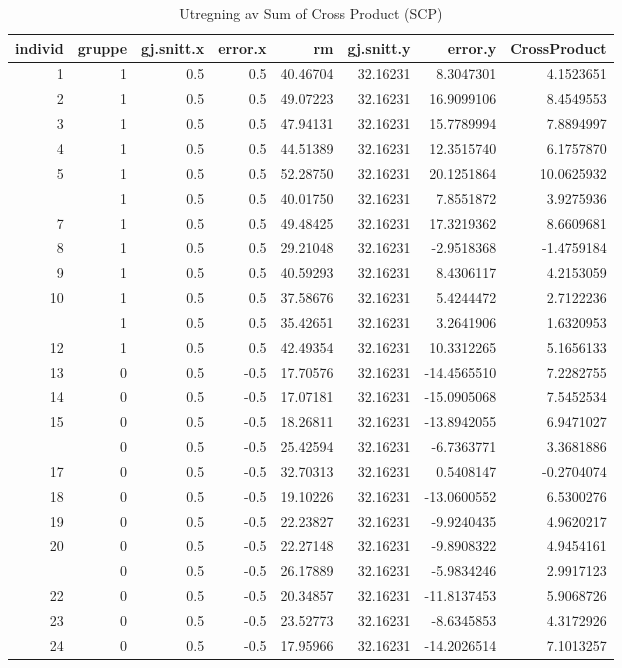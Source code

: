 \documentclass[
]{book}
\begin{document}
\begin{table}

\caption{\label{tab:unnamed-chunk-18}Utregning av Sum of Cross Product (SCP)}
\centering
\begin{tabular}[t]{rrrrrrrr}
\toprule
individ & gruppe & gj.snitt.x & error.x & rm & gj.snitt.y & error.y & CrossProduct\\
\midrule
1 & 1 & 0.5 & 0.5 & 40.46704 & 32.16231 & 8.3047301 & 4.1523651\\
2 & 1 & 0.5 & 0.5 & 49.07223 & 32.16231 & 16.9099106 & 8.4549553\\
3 & 1 & 0.5 & 0.5 & 47.94131 & 32.16231 & 15.7789994 & 7.8894997\\
4 & 1 & 0.5 & 0.5 & 44.51389 & 32.16231 & 12.3515740 & 6.1757870\\
5 & 1 & 0.5 & 0.5 & 52.28750 & 32.16231 & 20.1251864 & 10.0625932\\
\addlinespace
6 & 1 & 0.5 & 0.5 & 40.01750 & 32.16231 & 7.8551872 & 3.9275936\\
7 & 1 & 0.5 & 0.5 & 49.48425 & 32.16231 & 17.3219362 & 8.6609681\\
8 & 1 & 0.5 & 0.5 & 29.21048 & 32.16231 & -2.9518368 & -1.4759184\\
9 & 1 & 0.5 & 0.5 & 40.59293 & 32.16231 & 8.4306117 & 4.2153059\\
10 & 1 & 0.5 & 0.5 & 37.58676 & 32.16231 & 5.4244472 & 2.7122236\\
\addlinespace
11 & 1 & 0.5 & 0.5 & 35.42651 & 32.16231 & 3.2641906 & 1.6320953\\
12 & 1 & 0.5 & 0.5 & 42.49354 & 32.16231 & 10.3312265 & 5.1656133\\
13 & 0 & 0.5 & -0.5 & 17.70576 & 32.16231 & -14.4565510 & 7.2282755\\
14 & 0 & 0.5 & -0.5 & 17.07181 & 32.16231 & -15.0905068 & 7.5452534\\
15 & 0 & 0.5 & -0.5 & 18.26811 & 32.16231 & -13.8942055 & 6.9471027\\
\addlinespace
16 & 0 & 0.5 & -0.5 & 25.42594 & 32.16231 & -6.7363771 & 3.3681886\\
17 & 0 & 0.5 & -0.5 & 32.70313 & 32.16231 & 0.5408147 & -0.2704074\\
18 & 0 & 0.5 & -0.5 & 19.10226 & 32.16231 & -13.0600552 & 6.5300276\\
19 & 0 & 0.5 & -0.5 & 22.23827 & 32.16231 & -9.9240435 & 4.9620217\\
20 & 0 & 0.5 & -0.5 & 22.27148 & 32.16231 & -9.8908322 & 4.9454161\\
\addlinespace
21 & 0 & 0.5 & -0.5 & 26.17889 & 32.16231 & -5.9834246 & 2.9917123\\
22 & 0 & 0.5 & -0.5 & 20.34857 & 32.16231 & -11.8137453 & 5.9068726\\
23 & 0 & 0.5 & -0.5 & 23.52773 & 32.16231 & -8.6345853 & 4.3172926\\
24 & 0 & 0.5 & -0.5 & 17.95966 & 32.16231 & -14.2026514 & 7.1013257\\
\bottomrule
\end{tabular}
\end{table}
\end{document}
